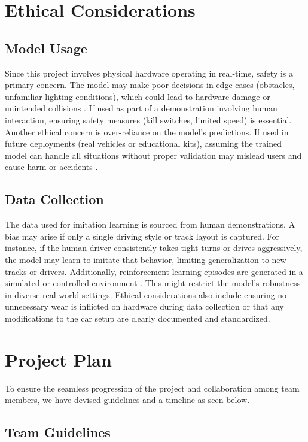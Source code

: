 \documentclass{article} %
\begin{document}
\section{Ethical Considerations}

\subsection{Model Usage}
Since this project involves physical hardware operating in real-time, safety is a primary concern. The model may make poor decisions in edge cases 
(obstacles, unfamiliar lighting conditions), which could lead to hardware damage or unintended collisions \citep{dalrymple2024guaranteedsafeaiframework}. If used as part of a demonstration 
involving human interaction, ensuring safety measures (kill switches, limited speed) is essential. Another ethical concern is over-reliance on the 
model's predictions. If used in future deployments (real vehicles or educational kits), assuming the trained model can handle all situations without 
proper validation may mislead users and cause harm or accidents \citep{laskey2017comparinghumancentricrobotcentricsampling}. 


\subsection{Data Collection}
The data used for imitation learning is sourced from human demonstrations. A bias may arise if only a single driving style or track layout is captured.
For instance, if the human driver consistently takes tight turns or drives aggressively, the model may learn to imitate that behavior, limiting 
generalization to new tracks or drivers. Additionally, reinforcement learning episodes are generated in a simulated or controlled environment 
\citep{laskey2017comparinghumancentricrobotcentricsampling}. 
This might restrict the model's robustness in diverse real-world settings. Ethical considerations also include ensuring no unnecessary wear is inflicted 
on hardware during data collection or that any modifications to the car setup are clearly documented and standardized.

\section{Project Plan}
To ensure the seamless progression of the project and collaboration among team members, we have devised guidelines and a timeline as seen below.

\subsection{Team Guidelines}
\end{document}
